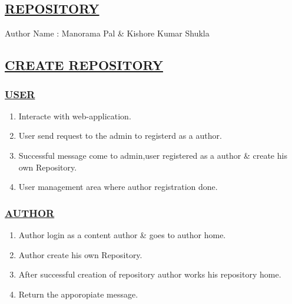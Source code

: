 \documentclass{article}
\begin{document}
\begin{center}
\section*{\underline{REPOSITORY}}
             Author Name : Manorama Pal \& Kishore Kumar Shukla


\end{center}

\subsection*{\underline{CREATE REPOSITORY}}
\subsubsection*{\underline{USER}}
\begin{enumerate}
                 \item Interacte with web-application.
                       \item User send request to the admin to registerd as a author.
                          \item Successful message come to admin,user registered as a author \& create his own  Repository.
                             \item User management area where author registration done.
                            
\begin{center}

\label{figure:Create_rep.latex}
\end{center}
\end{enumerate}



\subsubsection*{\underline{AUTHOR}}
          
  \begin{enumerate}
                     \item Author login as a content author \& goes to author home.
                          \item Author create his own  Repository.
                              \item After successful creation of repository author works his repository home.
                                  \item Return the apporopiate message.


\begin{center}

\label{figure:createauthor_rep.latex}
\end{center}
\end{enumerate}
\end{document}

